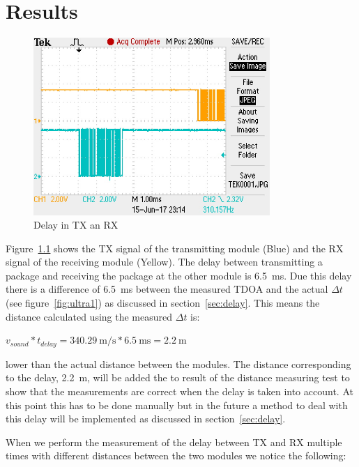\chapter{Results}
\label{chap:results}

\begin{figure}[H]
\centering
\includegraphics[width=0.8\textwidth]{Figures/delay_tx_rx.JPG}
\caption{Delay in TX an RX}
\label{fig:delay_tx_rx}
\end{figure}


Figure~\ref{fig:delay_tx_rx} shows the TX signal of the transmitting module (Blue) and the RX signal of the receiving module (Yellow).
The delay between transmitting a package and receiving the package at the other module is \SI{6.5}{\milli\second}.
Due this delay there is a difference of \SI{6.5}{\milli\second} between the measured TDOA and the actual $\Delta t$ (see figure~\ref{fig:ultra1}) as discussed in section~\ref{sec:delay}.
This means the distance calculated using the measured $\Delta t$ is:

$ v_{sound} * t_{delay} = \SI{340.29}{\meter\per\second} * \SI{6.5}{\milli\second} = \SI{2.2}{\meter} $

lower than the actual distance between the modules.
The distance corresponding to the delay, \SI{2.2}{\meter}, will be added the to result of the distance measuring test to show that the measurements are correct when the delay is taken into account.
At this point this has to be done manually but in the future a method to deal with this delay will be implemented as discussed in section~\ref{sec:delay}.

When we perform the measurement of the delay between TX and RX multiple times with different distances between the two modules we notice the following:

